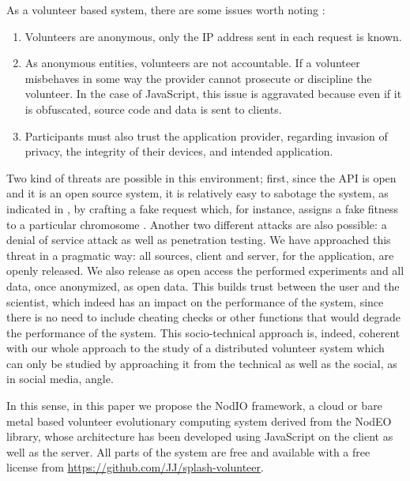 \documentclass[journal,onecolumn]{IEEEtran}
\begin{document}
As a volunteer based system, there are some issues worth 
noting \cite{sarmenta2001volunteer,web:BOINC} :\begin{enumerate}
\item Volunteers are anonymous, only the IP address sent in 
each request is known.
\item As anonymous entities, volunteers are not accountable. 
If a volunteer misbehaves in some way the provider cannot 
prosecute or discipline the volunteer. In the case of JavaScript,
this issue is aggravated because even if it is obfuscated, source code
and data is sent to clients. 
\item Participants must also trust the application provider, 
regarding invasion of privacy, the integrity of their devices, 
and intended application. 
\end{enumerate}

Two kind of threats are possible in this environment; first, since the
API is open and it is an open source system, it is relatively easy to
sabotage the system, as indicated in \cite{domingues2007sabotage}, by
crafting a fake request which, for instance, assigns a fake fitness to
a particular chromosome
. Another two different attacks are also
possible: a denial of service attack as well as penetration
testing. We have approached this threat in a pragmatic way: all
sources, client and server, for the application, are openly released. 
 We also release as open access the performed experiments \cite{DBLP:journals/corr/GuervosG15} and all data, once anonymized, as open data. This
builds trust between the user and the scientist, which indeed has an
impact on the performance of the system, since there is no need to
include cheating checks or other functions that would degrade the
performance of the system. This socio-technical approach is, indeed,
coherent with our whole approach to the study of a distributed volunteer
 system which can only be studied by approaching it from the
technical as well as the social, as in social media, angle. 

In this sense, in this paper we propose the {\sf NodIO} framework, a
cloud or bare metal based volunteer evolutionary computing system
derived from %
 the {\sf NodEO} library, whose architecture has been
developed using JavaScript on the client as well as the server.
All parts of the system are free and available with a free license
from \url{https://github.com/JJ/splash-volunteer}.
\end{document}
